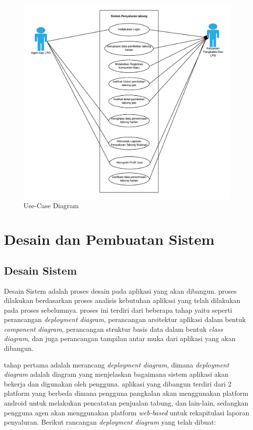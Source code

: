 	\vspace{-0.4cm}
	\begin{figure}[H]
		\center
		\includegraphics [width = 14cm]{gambar/model/use-case-diagram}
		\caption{Use-Case Diagram}
		\label{usecase}
	\end{figure}
	
	\section{Desain dan Pembuatan Sistem}
	
	\subsection{Desain Sistem}
	\par Desain Sistem adalah proses desain pada aplikasi yang akan dibangun. proses dilakukan berdasarkan proses analisis kebutuhan aplikasi yang telah dilakukan pada proses sebelumnya. proses ini terdiri dari beberapa tahap yaitu seperti perancangan \textit{deployment diagram},
	perancangan arsitektur aplikasi dalam bentuk \textit{component diagram}, perancangan struktur basis data dalam bentuk \textit{class diagram}, dan juga perancangan tampilan antar muka dari aplikasi yang akan dibangun.
	
	\par tahap pertama adalah merancang \textit{deployment diagram}, dimana \textit{deployment diagram} adalah diagram yang menjelaskan bagaimana sistem aplikasi akan bekerja dan digunakan oleh pengguna. aplikasi yang dibangun terdiri dari 2 platform yang berbeda dimana pengguna pangkalan akan menggunakan platform android untuk melakukan pencatatan penjualan tabung, dan lain-lain, sedangkan pengguna agen akan menggunakan platform \textit{web-based} untuk rekapitulasi laporan penyaluran. Berikut rancangan \textit{deployment diagram} yang telah dibuat:
	
